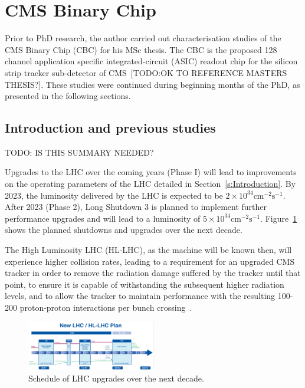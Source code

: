 \section{CMS Binary Chip}
\label{s:cbc}

Prior to PhD research, the author carried out characterisation studies of the CMS Binary Chip (CBC) for his
MSc thesis. The CBC is the proposed 128 channel application specific integrated-circuit (ASIC) readout chip for
the silicon strip tracker sub-detector of CMS~\cite{JacobJA}[TODO:OK TO REFERENCE MASTERS THESIS?]. These
studies were continued during beginning months of the PhD, as presented in the following sections.

\subsection{Introduction and previous studies}
\label{ss:introduction_and_previous_studies}
TODO: IS THIS SUMMARY NEEDED?

Upgrades to the LHC over the coming years (Phase I) will lead to improvements on the operating parameters of
the LHC detailed in Section~\ref{s:Introduction}. By 2023, the luminosity delivered by the LHC is expected to
be $2\times10^{34}\mathrm{cm^{-2}s^{-1}}$. After 2023 (Phase 2), Long Shutdown 3 is planned to implement
further performance upgrades and will lead to a luminosity of $5\times10^{34}\mathrm{cm^{-2}s^{-1}}$.
Figure~\ref{fig:lhc_upgrades} shows the planned shutdowns and upgrades over the next decade.

The High Luminosity LHC (HL-LHC), as the machine will be known then, will experience higher collision rates,
leading to a requirement for an upgraded CMS tracker in order to remove the radiation damage suffered by the
tracker until that point, to ensure it is capable of withstanding the subsequent higher radiation levels, and
to allow the tracker to maintain performance with the resulting 100-200 proton-proton interactions per bunch
crossing~\cite{Mersi:2011jv}.

\begin{figure}[ht] %
   \centering
     \includegraphics[width=0.5\textwidth]{Chapters/07_Appendices/07c_2_Images/newlhcplan}\hfill
     \caption{Schedule of LHC upgrades over the next decade.}
     \label{fig:lhc_upgrades}
\end{figure}

